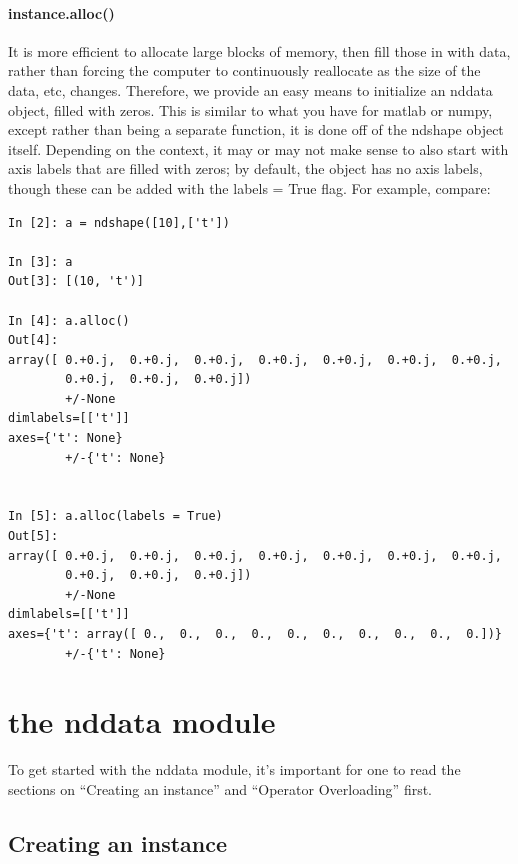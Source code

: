 \paragraph{instance.alloc()}
It is more efficient to allocate large blocks of memory, then fill those in with data, rather than forcing the computer to continuously reallocate as the size of the data, etc, changes.
Therefore, we provide an easy means to initialize an nddata object, filled with zeros.
This is similar to what you have for matlab or numpy, except rather than being a separate function, it is done off of the ndshape object itself.
Depending on the context, it may or may not make sense to also start with axis labels that are filled with zeros;
by default, the object has no axis labels, though these can be added with the labels = True flag.
For example, compare:
\begin{lstlisting}
In [2]: a = ndshape([10],['t'])

In [3]: a
Out[3]: [(10, 't')]

In [4]: a.alloc()
Out[4]:
array([ 0.+0.j,  0.+0.j,  0.+0.j,  0.+0.j,  0.+0.j,  0.+0.j,  0.+0.j,
        0.+0.j,  0.+0.j,  0.+0.j])
        +/-None
dimlabels=[['t']]
axes={'t': None}
        +/-{'t': None}


In [5]: a.alloc(labels = True)
Out[5]:
array([ 0.+0.j,  0.+0.j,  0.+0.j,  0.+0.j,  0.+0.j,  0.+0.j,  0.+0.j,
        0.+0.j,  0.+0.j,  0.+0.j])
        +/-None
dimlabels=[['t']]
axes={'t': array([ 0.,  0.,  0.,  0.,  0.,  0.,  0.,  0.,  0.,  0.])}
        +/-{'t': None}
\end{lstlisting}
\section{the nddata module}
To get started with the nddata module,
    it's important for one to read the sections on ``Creating an instance''
    and ``Operator Overloading'' first.
\subsection{Creating an instance}
